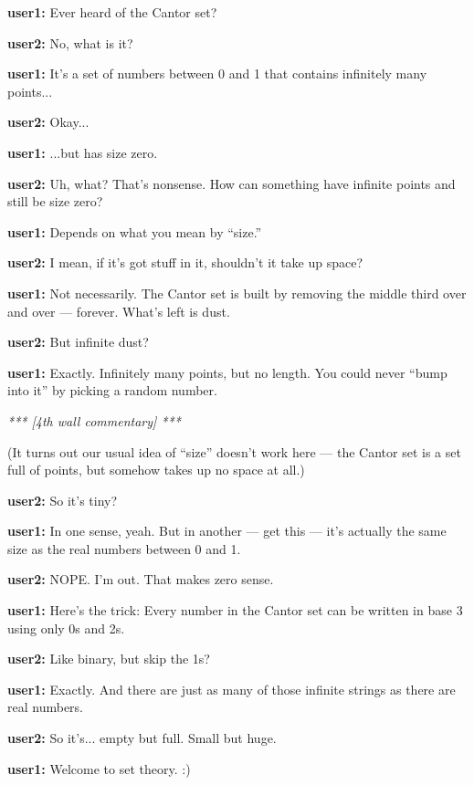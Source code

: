 {\ttfamily
\textbf{user1:} Ever heard of the Cantor set?

\textbf{user2:} No, what is it?

\textbf{user1:} It’s a set of numbers between 0 and 1 that contains infinitely many points...

\textbf{user2:} Okay...

\textbf{user1:} ...but has size zero.

\textbf{user2:} Uh, what? That’s nonsense. How can something have infinite points and still be size zero?

\textbf{user1:} Depends on what you mean by “size.”

\textbf{user2:} I mean, if it's got stuff in it, shouldn’t it take up space?

\textbf{user1:} Not necessarily. The Cantor set is built by removing the middle third over and over — forever. What’s left is dust.

\textbf{user2:} But infinite dust?

\textbf{user1:} Exactly. Infinitely many points, but no length. You could never “bump into it” by picking a random number.

\textit{*** [4th wall commentary] ***}

(It turns out our usual idea of “size” doesn’t work here — the Cantor set is a set full of points, but somehow takes up no space at all.)

\textbf{user2:} So it’s tiny?

\textbf{user1:} In one sense, yeah. But in another — get this — it’s actually the same size as the real numbers between 0 and 1.

\textbf{user2:} NOPE. I’m out. That makes zero sense.

\textbf{user1:} Here's the trick: Every number in the Cantor set can be written in base 3 using only 0s and 2s.

\textbf{user2:} Like binary, but skip the 1s?

\textbf{user1:} Exactly. And there are just as many of those infinite strings as there are real numbers.

\textbf{user2:} So it’s... empty but full. Small but huge.

\textbf{user1:} Welcome to set theory. :)
}



